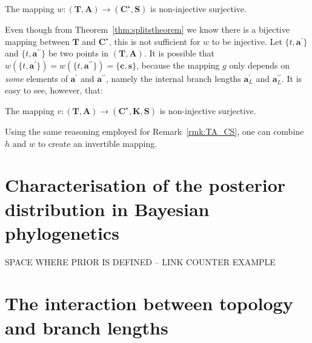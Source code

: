\begin{remark}
\label{rmk:TA_CS}
 The mapping $w: (\boldsymbol T, \boldsymbol A) \to (\boldsymbol C^\star, \boldsymbol S)$ is non-injective surjective.
\end{remark}
Even though from Theorem~\ref{thm:splitstheorem} we know there is a bijective mapping between $\boldsymbol T$ and $\boldsymbol C^\star$, this is not sufficient for $w$ to be injective.
Let $\{t, \boldsymbol a^\prime\}$ and $\{t, \boldsymbol a^{\prime\prime} \}$ be two points in $(\boldsymbol T, \boldsymbol A)$.
It is possible that $w(\{t, \boldsymbol a^\prime\}) = w(\{ t, \boldsymbol a^{\prime\prime} \}) = \{\boldsymbol c, \boldsymbol s\}$, because the mapping $ g $ only depends on \textit{some} elements of $\boldsymbol a^\prime$ and $\boldsymbol a^{\prime\prime}$, namely the internal branch lengths $\boldsymbol a_L^\prime$ and $\boldsymbol a_L^{\prime\prime}$.
It is easy to see, however, that:
\begin{remark}
 The mapping $v: (\boldsymbol T, \boldsymbol A) \to (\boldsymbol C^\star, \boldsymbol K, \boldsymbol S)$ is non-injective surjective.
\end{remark}
Using the same reasoning employed for Remark~\ref{rmk:TA_CS}, one can combine $h$ and $w$ to create an invertible mapping. 


\section{Characterisation of the posterior distribution in Bayesian phylogenetics}
\label{sec:prior_maths}
SPACE WHERE PRIOR IS DEFINED -- LINK COUNTER EXAMPLE


\section{The interaction between topology and branch lengths}

